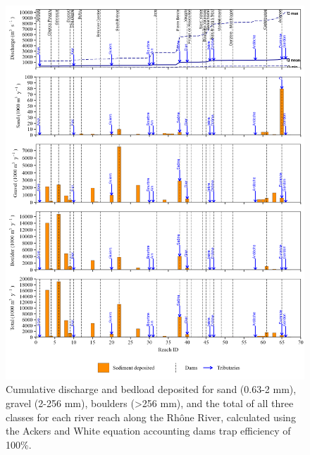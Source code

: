 \documentclass[
]{book}
\begin{document}
\begin{figure}
\includegraphics[width=26.24in]{img/res_cascade/res_E3_eA&W/plots_dep-silt/dep_res_sum_hy_E3_eA&W} \caption{Cumulative discharge and bedload deposited for sand (0.63-2 mm), gravel (2-256 mm), boulders (>256 mm), and the total of all three classes for each river reach along the Rhône River, calculated using the Ackers and White equation accounting dams trap efficiency of 100\%.}\label{fig:DepE3eA}
\end{figure}
\end{document}
